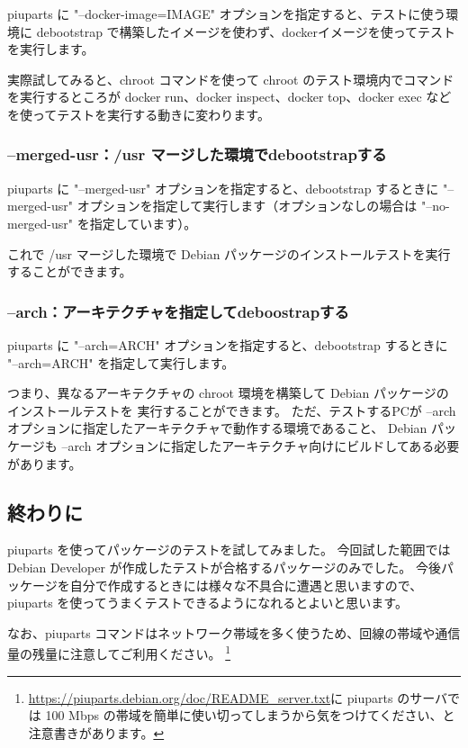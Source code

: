 \documentclass[mingoth,a4paper]{jsarticle}
\begin{document}
piuparts に "--docker-image=IMAGE" オプションを指定すると、テストに使う環境に
debootstrap で構築したイメージを使わず、dockerイメージを使ってテストを実行します。

実際試してみると、chroot コマンドを使って chroot のテスト環境内でコマンドを実行するところが
docker run、docker inspect、docker top、docker exec などを使ってテストを実行する動きに変わります。


\subsubsection{--merged-usr：/usr マージした環境でdebootstrapする}

piuparts に "--merged-usr" オプションを指定すると、debootstrap するときに "--merged-usr" オプションを指定して実行します（オプションなしの場合は "--no-merged-usr" を指定しています）。

これで /usr マージした環境で Debian パッケージのインストールテストを実行することができます。


\subsubsection{--arch：アーキテクチャを指定してdeboostrapする}

piuparts に "--arch=ARCH" オプションを指定すると、debootstrap するときに
"--arch=ARCH" を指定して実行します。

つまり、異なるアーキテクチャの chroot 環境を構築して Debian パッケージのインストールテストを
実行することができます。
ただ、テストするPCが --arch オプションに指定したアーキテクチャで動作する環境であること、
Debian パッケージも --arch オプションに指定したアーキテクチャ向けにビルドしてある必要があります。


\subsection{終わりに}

piuparts を使ってパッケージのテストを試してみました。
今回試した範囲では Debian Developer が作成したテストが合格するパッケージのみでした。
今後パッケージを自分で作成するときには様々な不具合に遭遇と思いますので、piuparts を使ってうまくテストできるようになれるとよいと思います。

なお、piuparts コマンドはネットワーク帯域を多く使うため、回線の帯域や通信量の残量に注意してご利用ください。
\footnote{\url{https://piuparts.debian.org/doc/README_server.txt}に piuparts のサーバでは 100 Mbps の帯域を簡単に使い切ってしまうから気をつけてください、と注意書きがあります。}
\end{document}
